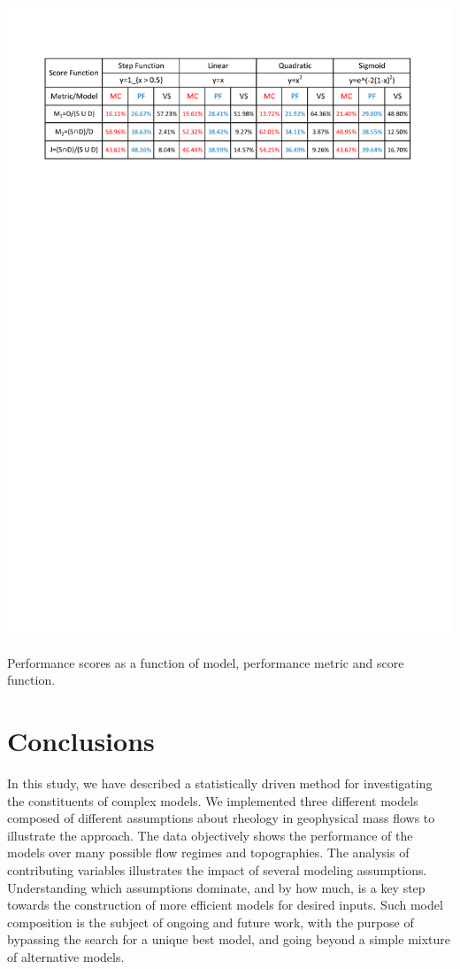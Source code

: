 \documentclass{article}
\begin{document}
\begin{table}[H]
         \centering
        \includegraphics[width=1\textwidth]{SuppInfo_table.pdf}
        \caption{Performance scores as a function of model, performance metric and score function.}
        \label{Table1}
\end{table}

\section{Conclusions}
In this study, we have described a statistically driven method for investigating the constituents of complex models. We implemented three different models composed of different assumptions about rheology in geophysical mass flows to illustrate the approach. The data objectively shows the performance of the models over many possible flow regimes and topographies. The analysis of contributing variables illustrates the impact of several modeling assumptions. Understanding which assumptions dominate, and by how much, is a key step towards the construction of more efficient models for desired inputs. Such model composition is the subject of ongoing and future work, with the purpose of bypassing the search for a unique best model, and going beyond a simple mixture of alternative models.
\end{document}
